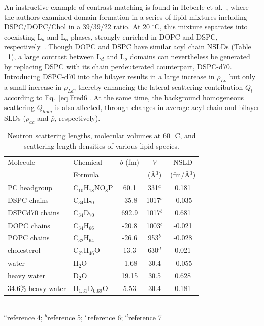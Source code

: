 \documentclass[8.5pt,twoside,twocolumn]{article}
\begin{document}
An instructive example of contrast matching is found in Heberle et al.~\cite{Heberle.2013}, where the authors examined domain formation in a series of lipid mixtures including DSPC/DOPC/Chol in a 39/39/22 ratio. At 20 $^\circ$C, this mixture separates into coexisting L$_d$ and L$_o$ phases, strongly enriched in DOPC and DSPC, respectively~\cite{Zhao.2007}. Though DOPC and DSPC have similar acyl chain NSLDs (Table ~\ref{tab:NSL}), a large contrast between L$_d$ and L$_o$ domains can nevertheless be generated by replacing DSPC with its chain perdeuterated counterpart, DSPC-d70. Introducing DSPC-d70 into the bilayer results in a large increase in $\rho_{Lo}$ but only a small increase in $\rho_{Ld}$, thereby enhancing the lateral scattering contribution $Q_l$ according to Eq.~\ref{eq.Fred6}. At the same time, the background homogeneous scattering $Q_{hom}$  is also affected, through changes in average acyl chain and bilayer SLDs ($\rho_{ac}$ and $\bar{\rho}$, respectively).

\begin{table} [b]
{\setlength{\tabcolsep}{4pt}
	\caption{Neutron scattering lengths, molecular volumes at 60 $^\circ$C, and scattering length densities of various lipid species.}
	\begin{tabular}{llccc}\hline
	 Molecule & Chemical & $b$ (fm) & $V$  & NSLD  \\
     &Formula & & (\AA$^3$) & (fm/\AA$^3$)\\
		\hline
		PC headgroup &	C$_{10}$H$_{18}$NO$_8$P & 60.1 & 331$^a$ & 0.181 \\
		DSPC chains & C$_{34}$H$_{70}$ & -35.8 & 1017$^b$ & -0.035 \\
		DSPCd70 chains & C$_{34}$D$_{70}$ & 692.9 & 1017$^b$ & 0.681 \\
		DOPC chains & C$_{34}$H$_{66}$ & -20.8 & 1003$^c$ & -0.021 \\
        POPC chains & C$_{32}$H$_{64}$ & -26.6 & 953$^b$ & -0.028 \\
        cholesterol & C$_{27}$H$_{46}$O & 13.3 & 630$^d$ & 0.021 \\
        water & H$_2$O & -1.68 & 30.4 & -0.055 \\
        heavy water & D$_2$O & 19.15 & 30.5 & 0.628 \\
        34.6\% heavy water& H$_{1.31}$D$_{0.69}$O & 5.53 & 30.4 & 0.181 \\
  
	\end{tabular}
    \label{tab:NSL}
    }
	\\
	{\footnotesize $^a$reference 4; $^b$reference 5; $^c$reference 6;  $^d$reference 7 }
\end{table}
\end{document}
